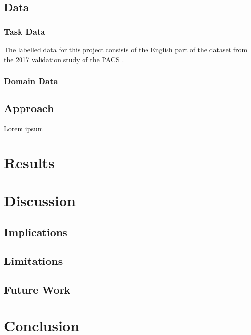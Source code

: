 \documentclass[12pt]{report}
\begin{document}
\subsection{Data}
\subsubsection*{Task Data}
The labelled data for this project consists of the English part of the dataset from the 2017 validation study of the PACS \cite{Talia2017}.

\subsubsection*{Domain Data}


\subsection{Approach}
Lorem ipsum

\section{Results}

\section{Discussion}

\subsection{Implications}

\subsection{Limitations}

\subsection{Future Work}

\section{Conclusion}




\appendix
\end{document}
